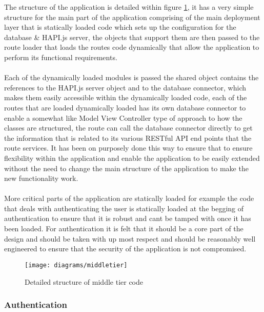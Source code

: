 The structure of the application is detailed within figure \ref{fig:middle_tier_code}, it has a very simple structure for the main part of the application comprising of the main deployment layer that is statically loaded code which sets up the configuration for the database \& HAPI.js server, the objects that support them are then passed to the route loader that loads the routes code dynamically that allow the application to perform its functional requirements.\\
\\
Each of the dynamically loaded modules is passed the shared object contains the references to the HAPI.js server object and to the database connector, which makes them easily accessible within the dynamically loaded code, each of the routes that are loaded dynamically loaded has its own database connector to enable a somewhat like Model View Controller type of approach to how the classes are structured, the route can call the database connector directly to get the information that is related to its various RESTful API end points that the route services. It has been on purposely done this way to ensure that to ensure flexibility within the application and enable the application to be easily extended without the need to change the main structure of the application to make the new functionality work.\\
\\
More critical parts of the application are statically loaded for example the code that deals with authenticating the user is statically loaded at the begging of authentication to ensure that it is robust and cant be tamped with once it has been loaded. For authentication it is felt that it should be a core part of the design and should be taken with up most respect and should be reasonably well engineered to ensure that the security of the application is not compromised.
 
\begin{figure}[H]
    \centering
    \texttt{[image: diagrams/middletier]}
    \caption{Detailed structure of middle tier code}
    \label{fig:middle_tier_code}
\end{figure} 

\subsubsection*{Authentication}


